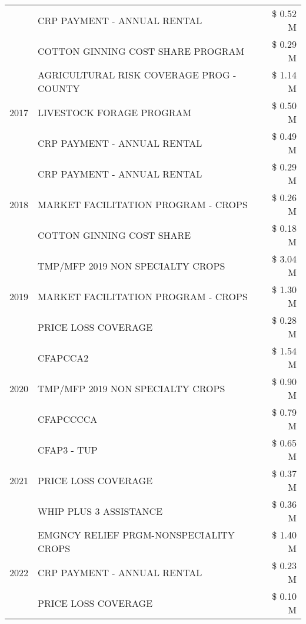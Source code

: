 \begin{tabular}{llr}
 & CRP PAYMENT - ANNUAL RENTAL & \$ 0.52 M \\
 & COTTON GINNING COST SHARE PROGRAM & \$ 0.29 M \\
\cline{1-3}
\multirow[t]{3}{*}{2017} & AGRICULTURAL RISK COVERAGE PROG - COUNTY & \$ 1.14 M \\
 & LIVESTOCK FORAGE PROGRAM & \$ 0.50 M \\
 & CRP PAYMENT - ANNUAL RENTAL & \$ 0.49 M \\
\cline{1-3}
\multirow[t]{3}{*}{2018} & CRP PAYMENT - ANNUAL RENTAL & \$ 0.29 M \\
 & MARKET FACILITATION PROGRAM - CROPS & \$ 0.26 M \\
 & COTTON GINNING COST SHARE & \$ 0.18 M \\
\cline{1-3}
\multirow[t]{3}{*}{2019} & TMP/MFP 2019 NON SPECIALTY CROPS & \$ 3.04 M \\
 & MARKET FACILITATION PROGRAM - CROPS & \$ 1.30 M \\
 & PRICE LOSS COVERAGE & \$ 0.28 M \\
\cline{1-3}
\multirow[t]{3}{*}{2020} & CFAPCCA2 & \$ 1.54 M \\
 & TMP/MFP 2019 NON SPECIALTY CROPS & \$ 0.90 M \\
 & CFAPCCCCA & \$ 0.79 M \\
\cline{1-3}
\multirow[t]{3}{*}{2021} & CFAP3 - TUP & \$ 0.65 M \\
 & PRICE LOSS COVERAGE & \$ 0.37 M \\
 & WHIP PLUS 3 ASSISTANCE & \$ 0.36 M \\
\cline{1-3}
\multirow[t]{3}{*}{2022} & EMGNCY RELIEF PRGM-NONSPECIALITY CROPS & \$ 1.40 M \\
 & CRP PAYMENT - ANNUAL RENTAL & \$ 0.23 M \\
 & PRICE LOSS COVERAGE & \$ 0.10 M \\
\cline{1-3}
\bottomrule
\end{tabular}
